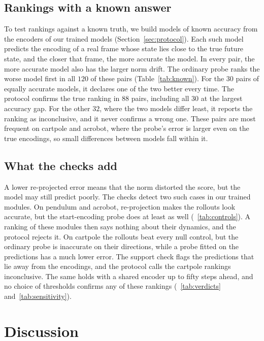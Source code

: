 \subsection{Rankings with a known answer}
\label{sec:res_rank}


To test rankings against a known truth, we build models of known accuracy from the encoders of our trained models (Section~\ref{sec:protocol}). Each such model predicts the encoding of a real frame whose state lies close to the true future state, and the closer that frame, the more accurate the model. In every pair, the more accurate model also has the larger norm drift. The ordinary probe ranks the worse model first in all $120$ of these pairs (Table~\ref{tab:known}). For the $30$ pairs of equally accurate models, it declares one of the two better every time. The protocol confirms the true ranking in $88$ pairs, including all $30$ at the largest accuracy gap. For the other $32$, where the two models differ least, it reports the ranking as inconclusive, and it never confirms a wrong one. These pairs are most frequent on cartpole and acrobot, where the probe's error is larger even on the true encodings, so small differences between models fall within it.

\subsection{What the checks add}
\label{sec:res_checks}
\label{sec:consequences}
A lower re-projected error means that the norm distorted the score, but the model may still predict poorly. The checks detect two such cases in our trained modules. On pendulum and acrobot, re-projection makes the rollouts look accurate, but the start-encoding probe does at least as well (\suptab~\ref{tab:controls}). A ranking of these modules then says nothing about their dynamics, and the protocol rejects it. On cartpole the rollouts beat every null control, but the ordinary probe is inaccurate on their directions, while a probe fitted on the predictions has a much lower error. The support check flags the predictions that lie away from the encodings, and the protocol calls the cartpole rankings inconclusive. The same holds with a shared encoder up to fifty steps ahead, and no choice of thresholds confirms any of these rankings (\suptabs~\ref{tab:verdicts} and~\ref{tab:sensitivity}).

\section{Discussion}
\label{sec:discussion}
